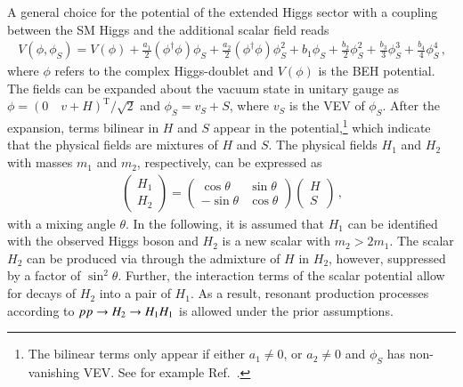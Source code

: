 \begin{description}
  A general choice for the potential of the extended Higgs sector with a
  coupling between the SM Higgs and the additional scalar field
  reads~\cite{OConnell:2006rsp,No:2013wsa,Chen:2014ask,DiMicco:2019ngk}
  \begin{align*}
    V(\phi, \phi_{S}) = V(\phi)
    + \frac{a_1}{2} (\phi^\dagger \phi) \phi_{S}
    + \frac{a_2}{2} (\phi^\dagger \phi) \phi_{S}^2
    + b_1 \phi_{S} + \frac{b_2}{2} \phi_{S}^2 + \frac{b_3}{3} \phi_{S}^3 + \frac{b_4}{4} \phi_{S}^4 \,\text{,}
  \end{align*}
  where $\phi$ refers to the complex Higgs-doublet and $V(\phi)$ is the BEH
  potential. The fields can be expanded about the vacuum state in unitary gauge
  as $\phi = (0 \quad v + H)^{\text{T}} / \sqrt{2}$ and $\phi_{S} = v_{S} + S$,
  where $v_{S}$ is the VEV of $\phi_{S}$. After the expansion, terms bilinear in
  $H$ and $S$ appear in the potential,\footnote{The bilinear terms only appear
    if either $a_1 \neq 0$, or $a_2 \neq 0$ and $\phi_{S}$ has non-vanishing
    VEV. See for example Ref.~\cite{Chen:2014ask}.}  which indicate that the
  physical fields are mixtures of $H$ and $S$. The physical fields $H_1$ and
  $H_2$ with masses $m_1$ and $m_2$, respectively, can be expressed as
  \begin{align*}
    \begin{pmatrix}
      H_1 \\
      H_2
    \end{pmatrix}
    =
    \begin{pmatrix}
      \cos\theta & \sin\theta \\
      -\sin\theta & \cos\theta
    \end{pmatrix}
    \begin{pmatrix}
      H \\
      S
    \end{pmatrix} \,\text{,}
  \end{align*}
  with a mixing angle $\theta$. In the following, it is assumed that $H_1$ can
  be identified with the observed Higgs boson and $H_2$ is a new scalar with
  $m_2 > 2 m_1$.  The scalar $H_2$ can be produced via \ggF through the
  admixture of $H$ in $H_2$, however, suppressed by a factor of
  $\sin^2\theta$. Further, the interaction terms of the scalar potential allow
  for decays of $H_2$ into a pair of $H_1$. As a result, resonant production
  processes according to $pp \to H_2 \to H_1 H_1$ is allowed under the prior
  assumptions.


\end{description}
